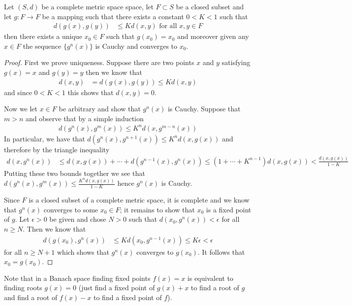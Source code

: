\begin{prop}\label{ContractionMappingPrinciple}Let $(S,d)$ be a complete
  metric space
  space, let $F \subset S$ be a closed subset and let $g : F \to F$ be
  a mapping such that there exists a constant $0 < K < 1$ such that 
\begin{align*}
d(g(x), g(y)) &\leq K d(x,y) \text{ for all $x,y \in F$}
\end{align*}
then there exists a unique $x_0 \in F$ such that $g(x_0) = x_0$ and
moreover given any $x \in F$ the sequence $\lbrace g^n(x) \rbrace$ is
Cauchy and converges to $x_0$.
\end{prop}
\begin{proof}
First we prove uniqueness.  Suppose there are two points $x$ and $y$
satisfying $g(x) = x$ and $g(y) = y$ then we know that
\begin{align*}
d(x,y) &= d(g(x), g(y)) \leq K d(x,y)
\end{align*}
and since $0 < K < 1$ this shows that $d(x,y) = 0$.

Now we let $x \in F$ be arbitrary and show that $g^n(x)$ is Cauchy.
Suppose that $m > n$ and observe that by a simple induction
\begin{align*}
d(g^n(x), g^m(x)) \leq K^n d(x, g^{m-n}(x))
\end{align*}
In particular, we have that $d(g^n(x), g^{n+1}(x)) \leq K^n d(x,g(x))$
and therefore by the triangle inequality 
\begin{align*}
d(x, g^n(x)) &\leq d(x, g(x)) + \dotsm + d(g^{n-1}(x), g^n(x)) \leq (1
               + \dotsm + K^{n-1}) d(x,g(x)) < \frac{d(x,g(x))}{1-K}
\end{align*}
Putting these two bounds together we see that $d(g^n(x), g^m(x)) \leq  \frac{K^n
  d(x,g(x))}{1-K}$ hence $g^n(x)$ is Cauchy.  

Since $F$ is
a closed subset of a complete metric space, it is 
complete and we know that $g^n(x)$ converges to some $x_0 \in F$; it remains to show that $x_0$
is a fixed point of $g$.  Let $\epsilon > 0$ be given and chose $N >
0$ such that $d(x_0, g^n(x)) < \epsilon$ for all $n \geq N$.  Then we
know that 
\begin{align*}
d(g(x_0), g^n(x)) &\leq K d(x_0, g^{n-1}(x)) \leq K\epsilon < \epsilon
\end{align*}
for all $n \geq N+1$ which shows that $g^n(x)$ converges to $g(x_0)$.  It
follows that $x_0 = g(x_0)$.
\end{proof}

Note that in a Banach space finding fixed points $f(x) = x$ is
equivalent to finding roots $g(x) = 0$ (just find a fixed point of
$g(x) + x$ to find a root of $g$ and find a root of $f(x) - x$ to find
a fixed point of $f$). 

